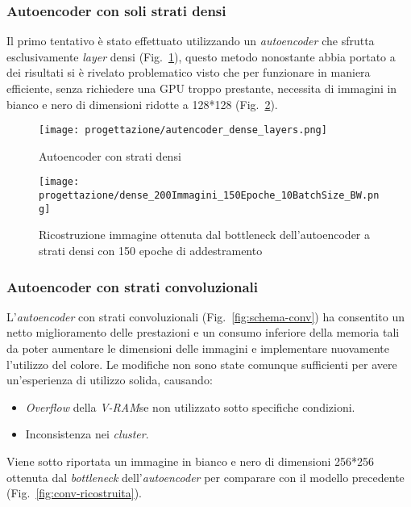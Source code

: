 \subsubsection{Autoencoder con soli strati densi}
Il primo tentativo è stato effettuato utilizzando un \emph{autoencoder} che sfrutta esclusivamente \emph{layer} densi (Fig.~\ref{fig:schema-denso}), questo metodo nonostante abbia portato a dei risultati si è rivelato problematico visto che per funzionare in maniera efficiente, senza richiedere una GPU troppo prestante, necessita di immagini in bianco e nero di dimensioni ridotte a 128*128 (Fig.~\ref{fig:dense-ricostruita}).

\begin{figure}[!h] 
  \centering 
  \texttt{[image: progettazione/autencoder\_dense\_layers.png]} 
  \caption{Autoencoder con strati densi}
  \label{fig:schema-denso}
\end{figure}


\begin{figure}[!h] 
  \centering 
  \texttt{[image: progettazione/dense\_200Immagini\_150Epoche\_10BatchSize\_BW.png]} 
  \caption{Ricostruzione immagine ottenuta dal bottleneck dell'autoencoder a strati densi con 150 epoche di addestramento}
  \label{fig:dense-ricostruita}
\end{figure}

\newpage

\subsubsection{Autoencoder con strati convoluzionali}
L'\emph{autoencoder} con strati convoluzionali (Fig.~\ref{fig:schema-conv}) ha consentito un netto miglioramento delle prestazioni e un consumo inferiore della memoria tali da poter aumentare le dimensioni delle immagini e implementare nuovamente l'utilizzo del colore.
Le modifiche non sono state comunque sufficienti per avere un'esperienza di utilizzo solida, causando:
\begin{itemize}
  \item \emph{Overflow} della \emph{\gls{V-RAM}}\glsfirstoccur se non utilizzato sotto specifiche condizioni.
  \item Inconsistenza nei \emph{cluster}.
\end{itemize}
Viene sotto riportata un immagine in bianco e nero di dimensioni 256*256 ottenuta dal \emph{bottleneck} dell'\emph{autoencoder} per comparare con il modello precedente (Fig.~\ref{fig:conv-ricostruita}).


